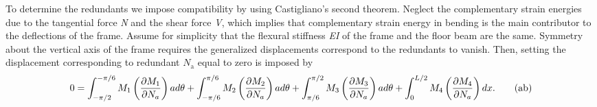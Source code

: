 \documentclass{AeroStructure-ERJohnson}
\begin{document}
\begin{example}
To determine the redundants we impose compatibility by using Castigliano's second theorem. Neglect the complementary strain energies due to the tangential force \textit{N} and the shear force \textit{V}, which implies that complementary strain energy in bending is the main contributor to the deflections of the frame. Assume for simplicity that the flexural stiffness \textit{EI} of the frame and the floor beam are the same. Symmetry about the vertical axis of the frame requires the generalized displacements correspond to the redundants to vanish. Then, setting the displacement corresponding to redundant $N_{\textrm{a}}$ equal to zero is imposed by
\begin{equation}
0=\int_{-\pi / 2}^{-\pi / 6} M_{1}\left(\frac{\partial M_{1}}{\partial N_{a}}\right) a d \theta+\int_{-\pi / 6}^{\pi / 6} M_{2}\left(\frac{\partial M_{2}}{\partial N_{a}}\right) a d \theta+\int_{\pi / 6}^{\pi / 2} M_{3}\left(\frac{\partial M_{3}}{\partial N_{a}}\right) a d \theta+\int_{0}^{L /2} M_{4}\left(\frac{\partial M_{4}}{\partial N_{a}}\right) d x. \label{eq7.7.ab}\tag{{ab}}
\end{equation}
\clearpage


\end{example}
\end{document}
